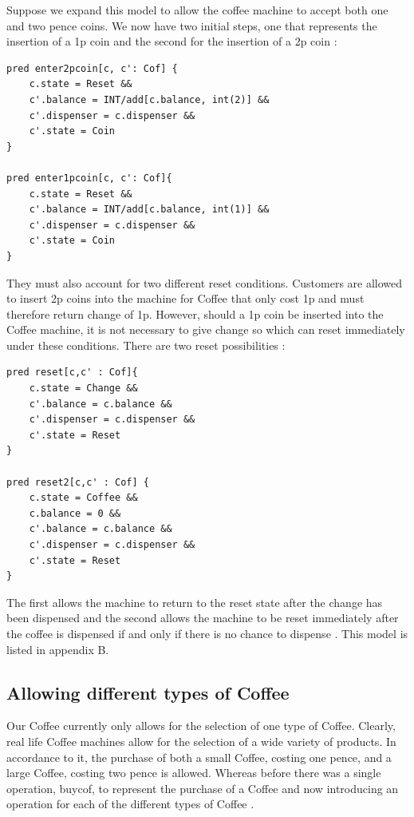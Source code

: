 \documentclass[a4paper,12pt]{report}
\begin{document}
Suppose we expand this model to allow the coffee machine to accept both one and two pence coins. We now have two initial steps, one that represents the insertion of a 1p coin and the second for the insertion of a 2p coin \cite{RussellBoyatt}:

\begin{verbatim}
pred enter2pcoin[c, c': Cof] {
	c.state = Reset &&
	c'.balance = INT/add[c.balance, int(2)] &&
	c'.dispenser = c.dispenser &&
	c'.state = Coin
}

pred enter1pcoin[c, c': Cof]{
	c.state = Reset &&
	c'.balance = INT/add[c.balance, int(1)] &&
	c'.dispenser = c.dispenser &&
	c'.state = Coin
}
\end{verbatim}
They must also account for two different reset conditions. Customers are allowed to insert 2p coins into the machine for Coffee that only cost 1p and must therefore return change of 1p. However, should a 1p coin be inserted into the Coffee machine, it is not necessary to give change so which can reset immediately under these conditions. There are two reset possibilities \cite{RussellBoyatt}:

\begin{verbatim}
pred reset[c,c' : Cof]{
	c.state = Change &&
	c'.balance = c.balance &&
	c'.dispenser = c.dispenser &&
	c'.state = Reset
}

pred reset2[c,c' : Cof] {
	c.state = Coffee &&
	c.balance = 0 &&
	c'.balance = c.balance &&
	c'.dispenser = c.dispenser &&
	c'.state = Reset
}
\end{verbatim}

The first allows the machine to return to the reset state after the change has been dispensed and the second allows the machine to be reset immediately after the coffee is dispensed if and only if there is no chance to dispense \cite{RussellBoyatt}. This model is listed in appendix B.

\subsection{Allowing different types of Coffee}
\label{Different Coffees}

Our Coffee currently only allows for the selection of one type of Coffee. Clearly, real life Coffee machines allow for the selection of a wide variety of products. In accordance to it, the purchase of both a small Coffee, costing one pence, and a large Coffee, costing two pence is allowed. Whereas before there was a single operation, buycof, to represent the purchase of a Coffee and now introducing an operation for each of the different types of Coffee \cite{RussellBoyatt}.
\end{document}
